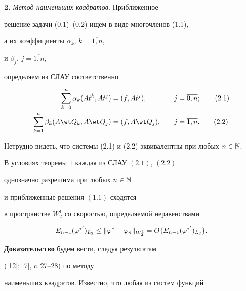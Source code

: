 \medskip





{\bf 2.} {\it Метод наименьших квадратов.} Приближенное 


решение задачи (0.1)--(0.2) ищем в виде многочленов (1.1), 


а их коэффициенты $\alpha_k$, $k=\overline{1,n}$,


и $\beta_j$, $j=\overline{1,n}$,


определяем из СЛАУ соответственно


\begin{alignat}{2}


\sum_{k=0}^{n}\alpha_k(At^k,At^j)&=(f,At^j),&\quad j&=\overline{0,n};


\tag{2.1} \\


%


\sum_{k=1}^{n}\beta_k(A\wt Q_k,A\wt Q_j)&=(f,A\wt Q_j),&\quad j&=


\overline{1,n}.


\tag{2.2}


\end{alignat}


Нетрудно видеть, что системы (2.1) и (2.2) эквивалентны при любых $n\in\Bbb N$.





\begin{thm}


В условиях теоремы $1$ каждая из СЛАУ $(2.1)$, $(2.2)$ 


однозначно разрешима при любых $n\in\Bbb N$


и приближенные решения $(1.1)$ сходятся


в пространстве $W^1_2$ со скоростью, определяемой неравенствами


$$


E_{n-1}(\vp^{*'})_{L_2}\le


\|\vp^*-\vp_n\|_{W^1_2}=O\{E_{n-1}(\vp^{*'})_{L_2}\}.


$$


\end{thm}





{\bf Доказательство} будем вести, следуя результатам


([12]; [7], c.\,27--28) по методу 


наименьших квадратов. Известно, что любая из систем функций 


